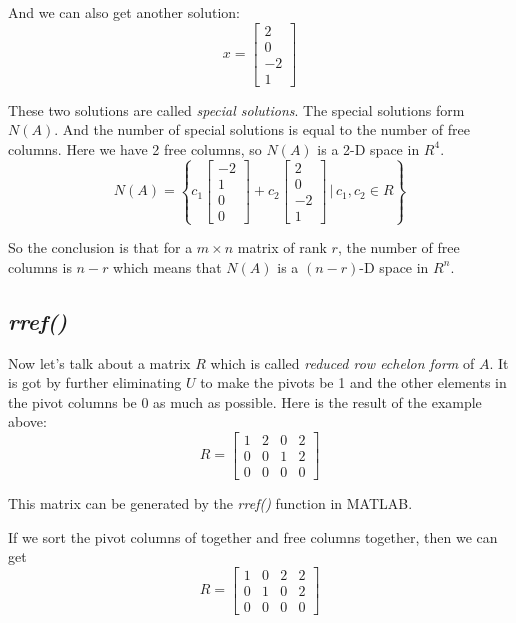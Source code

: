 \documentclass[10pt,a4paper,oneside,numbers=noenddot]{scrbook}
\theoremstyle{ctplain}
\theoremstyle{ctresult}
\begin{document}
And we can also get another solution:
\[
  x = \begin{bmatrix}
    2 \\ 0 \\ -2 \\ 1
  \end{bmatrix}
\]

These two solutions are called \emph{special solutions}. The special solutions
form $N(A)$. And the number of special solutions is equal to the number of free
columns. Here we have 2 free columns, so $N(A)$ is a 2-D space in $R^{4}$.
\[
  N(A) = \left\{ c_1 \begin{bmatrix} -2 \\ 1 \\ 0 \\ 0 \end{bmatrix} +
               c_2 \begin{bmatrix} 2 \\ 0 \\ -2 \\ 1 \end{bmatrix}
               \,|\, c_1, c_2 \in R \right\}
\]

So the conclusion is that for a $m \times n$ matrix of rank $r$, the number of free
columns is $n - r$ which means that $N(A)$ is a $(n - r)$-D space in $R^{n}$.

\subsection{\textit{rref()}}

Now let's talk about a matrix $R$ which is called \emph{reduced row echelon form}
of $A$. It is got by further eliminating $U$ to make the pivots be 1 and the other
elements in the pivot columns be 0 as much as possible. Here is the result of the
example above:
\[
  R = \begin{bmatrix}
    1 & 2 & 0 & 2 \\
    0 & 0 & 1 & 2 \\
    0 & 0 & 0 & 0
  \end{bmatrix}
\]

This matrix can be generated by the \textit{rref()} function in MATLAB.

If we sort the pivot columns of together and free columns together, then we can get
\[
  R = \begin{bmatrix}
    1 & 0 & 2 & 2 \\
    0 & 1 & 0 & 2 \\
    0 & 0 & 0 & 0
  \end{bmatrix}
\]
\end{document}
